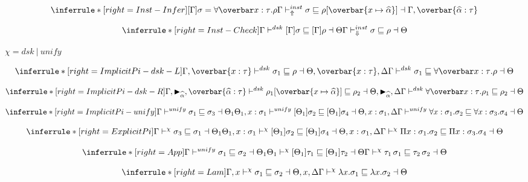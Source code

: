 \framebox{$ \Gamma \instinfercheck \sigma \sqsubseteq \rho \dashv \Theta$ }

\[
\inferrule*[right=Inst-Infer]
{[\Gamma] \sigma = \forallvars{x:\tau}. \rho
}
{\Gamma \instinfer \sigma \sqsubseteq \rho[\overbar{\tpmapsto {\tau} x {\widehat{\alpha}}}] \dashv \Gamma, \overbar{\widehat{\alpha}:\tau}}
\]

\[
\inferrule*[right=Inst-Check]
{\Gamma \dsk [\Gamma]\sigma \sqsubseteq [\Gamma]\rho \dashv \Theta} { \Gamma \instcheck \sigma \sqsubseteq \rho \dashv \Theta}
\]

\newcommand{\dskunify}[0]{\vdash^{\chi}}
\framebox{$ \Gamma \dskunify \sigma_1 \sqsubseteq \sigma_2 \dashv \Theta$} $\chi = dsk~|~unify$

\[
\inferrule*[right=ImplicitPi-dsk-L]
{
\Gamma, \overbar{x:\tau} \dsk \sigma_1 \sqsubseteq \rho \dashv \Theta, \overbar{x:\tau}, \Delta}
{\Gamma \dsk \sigma_1 \sqsubseteq \forallvars{x:\tau}. \rho \dashv \Theta}
\]

\[
\inferrule*[right=ImplicitPi-dsk-R]
{\Gamma , \blacktriangleright_{\widehat \alpha}, \overbar{\widehat \alpha : \tau} \dsk \rho_1[\overbar{\tpmapsto \tau x {\widehat \alpha}}] \sqsubseteq \rho_2 \dashv \Theta, \blacktriangleright_{\widehat \alpha}, \Delta}
{\Gamma \dsk \forallvars{x:\tau}.\rho_1 \sqsubseteq \rho_2 \dashv \Theta}
\]

\[
\inferrule*[right=ImplicitPi-unify]
{\Gamma \unify  \sigma_1 \sqsubseteq \sigma_3 \dashv \Theta_1 \\
\Theta_1, x:\sigma_1 \unify [\Theta_1]\sigma_2 \sqsubseteq [\Theta_1]\sigma_4 \dashv \Theta, x:\sigma_1, \Delta}
{ \Gamma \unify \forall x:\sigma_1. \sigma_2 \sqsubseteq \forall x:\sigma_3. \sigma_4 \dashv \Theta}
\]

\[
\inferrule*[right=ExplicitPi]
{\Gamma \dskunify  \sigma_3 \sqsubseteq \sigma_1 \dashv \Theta_1 \\
\Theta_1, x:\sigma_1 \dskunify [\Theta_1]\sigma_2 \sqsubseteq [\Theta_1]\sigma_4 \dashv \Theta, x:\sigma_1, \Delta}
{ \Gamma \dskunify \Pi x:\sigma_1. \sigma_2 \sqsubseteq \Pi x:\sigma_3. \sigma_4 \dashv \Theta}
\]

\[
\inferrule*[right=App]
{
\Gamma \unify \sigma_1 \sqsubseteq \sigma_2 \dashv \Theta_1 \\
\Theta_1 \dskunify [\Theta_1]\tau_1 \sqsubseteq [\Theta_1]\tau_2 \dashv \Theta
}
{\Gamma \dskunify \tau_1\, \sigma_1 \sqsubseteq \tau_2\, \sigma_2 \dashv \Theta}
\]

\[
\inferrule*[right=Lam]
{
\Gamma, x \dskunify \sigma_1 \sqsubseteq \sigma_2 \dashv \Theta, x, \Delta}
{\Gamma \dskunify \lambda x. \sigma_1 \sqsubseteq \lambda x. \sigma_2 \dashv \Theta }
\]


